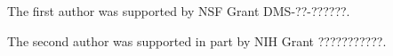 \documentclass[aos]{imsart}
\theoremstyle{plain}
\begin{document}
\begin{acks}[Acknowledgments]
\end{acks}

\begin{funding}
The first author was supported by NSF Grant DMS-??-??????.

The second author was supported in part by NIH Grant ???????????.
\end{funding}
\end{document}
